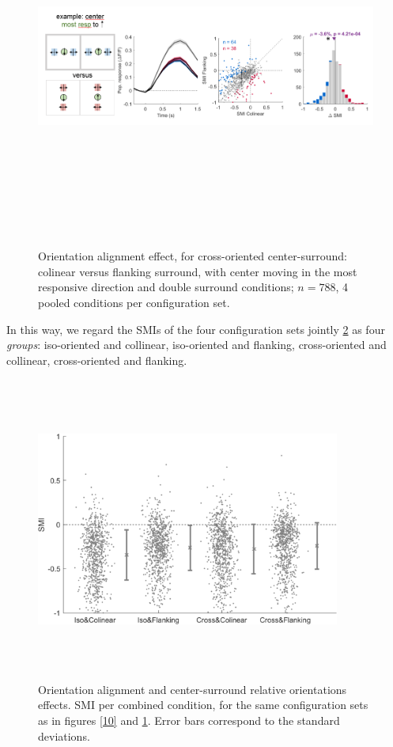 \begin{figure}[H] \centering \includegraphics[width=12cm,height=12cm,keepaspectratio]{Figures/7.Results/finalPopulation/sel/diagrams/11.png} 
\caption{Orientation alignment effect, for cross-oriented center-surround: colinear versus flanking surround, with center moving in the most responsive direction and double surround conditions;  $n=788$, 4 pooled conditions per configuration set.} \label{11} 
\end{figure}

In this way, we regard the SMIs of the four configuration sets jointly \ref{anova1} as four \textit{groups}: iso-oriented and collinear, iso-oriented and flanking, cross-oriented and collinear, cross-oriented and flanking.

\begin{figure}[H] \centering \includegraphics[width=10cm,height=10cm,keepaspectratio]{Figures/7.Results/finalPopulation/sel/popPlots_VisROIs_Cor_2SalignmentAngle.png} 
\caption{Orientation alignment and center-surround relative orientations effects. SMI per combined condition, for the same configuration sets as in figures \ref{10} and \ref{11}. Error bars correspond to the standard deviations.} 
\label{anova1}
\end{figure}

